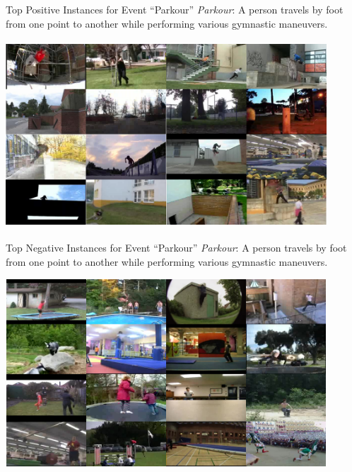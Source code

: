 \documentclass{beamer}
\begin{document}
\begin{frame}{Top Positive Instances for Event ``Parkour''} 	
\small{\textit{Parkour}: A person travels by foot from one point to another while performing various gymnastic maneuvers.}	
	\begin{center}
		\includegraphics[width=12cm,height=7cm]{images/part4/parkour.png}
	\end{center}
	
\end{frame}	

\begin{frame}{Top Negative Instances for Event ``Parkour''} 	
\small{\textit{Parkour}: A person travels by foot from one point to another while performing various gymnastic maneuvers.}	
	\begin{center}
		\includegraphics[width=12cm,height=7cm]{images/part4/parkour_neg.png}
	\end{center}
	
\end{frame}	
\end{document}
